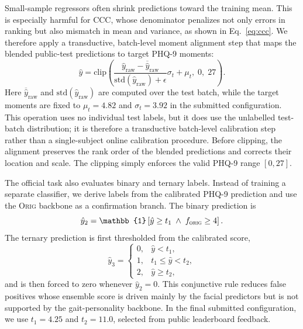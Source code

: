 \documentclass[sigconf,screen,review]{acmart}
\begin{document}
Small-sample regressors often shrink predictions toward the training mean. This
is especially harmful for CCC, whose denominator penalizes not only errors in
ranking but also mismatch in mean and variance, as shown in
Eq.~\ref{eq:ccc}. We therefore apply a transductive, batch-level moment
alignment step that maps the blended public-test predictions to target PHQ-9
moments:
\begin{equation}
\hat{y}
=
\mathrm{clip}\left(
\frac{
\hat{y}_{\mathrm{raw}}-\overline{\hat{y}}_{\mathrm{raw}}
}
{\mathrm{std}(\hat{y}_{\mathrm{raw}})+\epsilon}
\sigma_t+\mu_t,\;
0,\;27
\right).
\label{eq:variance-align}
\end{equation}
Here $\overline{\hat{y}}_{\mathrm{raw}}$ and
$\mathrm{std}(\hat{y}_{\mathrm{raw}})$ are computed over the test batch, while
the target moments are fixed to $\mu_t=4.82$ and $\sigma_t=3.92$ in the
submitted configuration. This operation uses no individual test labels, but it
does use the unlabelled test-batch distribution; it is therefore a transductive
batch-level calibration step rather than a single-subject online calibration
procedure. Before clipping, the alignment preserves the rank order of the
blended predictions and corrects their location and scale. The clipping simply
enforces the valid PHQ-9 range $[0,27]$.

The official task also evaluates binary and ternary labels. Instead of training
a separate classifier, we derive labels from the calibrated PHQ-9 prediction and
use the \textsc{Orig} backbone as a confirmation branch. The binary prediction
is
\begin{equation}
\hat{y}_2 =
\mathbb{1}\left[
\hat{y}\ge t_1
\;\wedge\;
f_{\textsc{orig}}\ge 4
\right].
\label{eq:binary-rule}
\end{equation}
The ternary prediction is first thresholded from the calibrated score,
\begin{equation}
\hat{y}_3 =
\begin{cases}
0, & \hat{y}<t_1,\\
1, & t_1\le \hat{y}<t_2,\\
2, & \hat{y}\ge t_2,
\end{cases}
\label{eq:ternary-rule}
\end{equation}
and is then forced to zero whenever $\hat{y}_2=0$. This conjunctive rule reduces
false positives whose ensemble score is driven mainly by the facial predictors but
is not supported by the gait-personality backbone. In the final submitted
configuration, we use $t_1=4.25$ and $t_2=11.0$, selected from public
leaderboard feedback.
\end{document}

